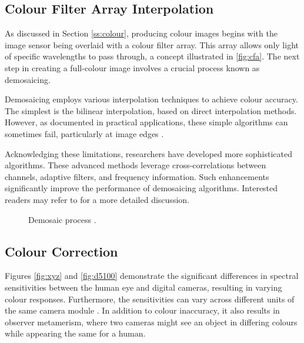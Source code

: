 \subsection{Colour Filter Array Interpolation}

As discussed in Section \ref{ss:colour}, producing colour images begins with the image sensor being overlaid with a colour filter array. This array allows only light of specific wavelengths to pass through, a concept illustrated in \ref{fig:cfa}. The next step in creating a full-colour image involves a crucial process known as demosaicing.

Demosaicing employs various interpolation techniques to achieve colour accuracy. The simplest is the bilinear interpolation, based on direct interpolation methods. However, as documented in practical applications, these simple algorithms can sometimes fail, particularly at image edges \cite[46]{Ramanath}.

Acknowledging these limitations, researchers have developed more sophisticated algorithms. These advanced methods leverage cross-correlations between channels, adaptive filters, and frequency information. Such enhancements significantly improve the performance of demosaicing algorithms. Interested readers may refer to \cite{gunturk2005demosaicking} for a more detailed discussion.


\begin{figure}
    \centering
    \caption{Demosaic process \cite{demosaic}.}
    \label{fig:demosaic}
\end{figure}

\subsection{Colour Correction}
 \label{ss:cc}
Figures \ref{fig:xyz} and \ref{fig:d5100} demonstrate the significant differences in spectral sensitivities between the human eye and digital cameras, resulting in varying colour responses. Furthermore, the sensitivities can vary across different units of the same camera module \cite{walowit2019best}. In addition to colour inaccuracy, it also results in observer metamerism, where two cameras might see an object in differing colours while appearing the same for a human.

